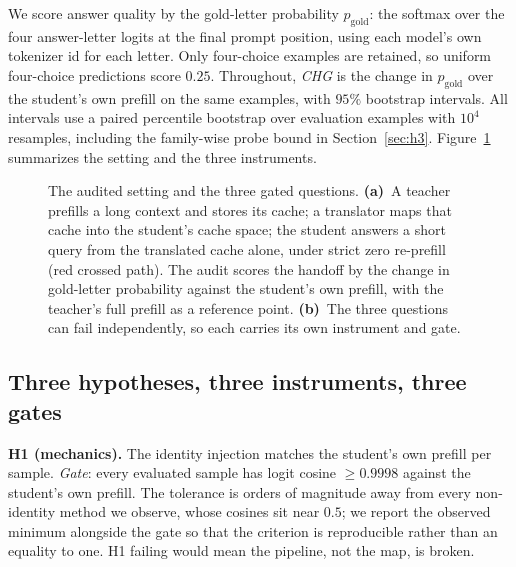 \documentclass{article} %
\newcommand{\gold}{\ensuremath{p_{\mathrm{gold}}}}
\begin{document}
We score answer quality by the gold-letter probability $\gold$: the softmax over
the four answer-letter logits at the final prompt position, using each model's
own tokenizer id for each letter. Only four-choice examples are retained, so
uniform four-choice predictions score $0.25$. Throughout, \emph{CHG} is the change in
$\gold$ over the student's own prefill on the same examples, with $95\%$
bootstrap intervals. All intervals use a paired percentile bootstrap over
evaluation examples with $10^4$ resamples, including the family-wise probe
bound in Section~\ref{sec:h3}. Figure~\ref{fig:framework} summarizes the
setting and the three instruments.

\begin{figure}[t]
\centering

\caption{The audited setting and the three gated questions. \textbf{(a)}~A
teacher prefills a long context and stores its cache; a translator maps that
cache into the student's cache space; the student answers a short query from the
translated cache alone, under strict zero re-prefill (red crossed path). The
audit scores the handoff by the change in gold-letter probability against the
student's own prefill, with the teacher's full prefill as a reference point.
\textbf{(b)}~The three questions can fail independently, so each carries its own
instrument and gate.}
\label{fig:framework}
\end{figure}

\subsection{Three hypotheses, three instruments, three gates}
\textbf{H1 (mechanics).} The identity injection matches the student's own
prefill per sample. \emph{Gate}: every evaluated sample has logit cosine
$\ge 0.9998$ against the student's own prefill. The tolerance is orders of
magnitude away from every non-identity method we observe, whose cosines sit near
$0.5$; we report the observed minimum alongside the gate so that the criterion
is reproducible rather than an equality to one. H1 failing would mean the
pipeline, not the map, is broken.
\end{document}
